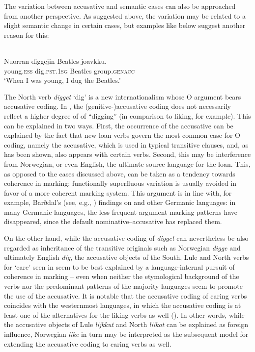 \documentclass[output=paper]{LSP/langsci}
\begin{document}
The variation between accusative and semantic cases can also be approached from another perspective. As suggested above, the variation may be related to a slight semantic change in certain cases, but examples like  below suggest another reason for this:

\begin{exe}
\ex%
\label{16-ki-ex:20}
\\
\gll Nuorran diggejin Beatles joavkku.\\
young.\textsc{ess} dig.\textsc{pst}.\textsc{1sg} Beatles group.\textsc{genacc}\\
\glt ‘When I was young, I dug the Beatles.’ 
\end{exe}


The North  verb \textit{digget} ‘dig’ is a new internationalism whose O argument bears accusative coding. In , the (genitive-)accusative coding does not necessarily reflect a higher degree of  of “digging” (in comparison to liking, for example). This can be explained in two ways. First, the occurrence of the accusative can be explained by the fact that new loan verbs govern the most common case for O coding, namely the accusative, which is used in typical transitive clauses, and, as has been shown, also appears with certain  verbs. Second, this may be interference from Norwegian, or even English, the ultimate source language for the loan. This, as opposed to the cases discussed above, can be taken as a tendency towards coherence in marking; functionally superfluous variation is usually avoided in favor of a more coherent marking system. This argument is in line with, for example, Barðdal’s (see, e.g., \citealt{Barddal2008Productivity,Barddal2009Germanic}) findings on  and other Germanic languages: in many Germanic languages, the less frequent argument marking patterns have disappeared, since the default nominative–accusative has replaced them.

 On the other hand, while the accusative coding of \textit{digget}  can nevertheless be also regarded as inheritance of the transitive originals such as Norwegian \textit{digge} and ultimately English \textit{dig}, the accusative objects of the South, Lule and North  verbs for ‘care’ seen in  seem to be best explained by a language-internal pursuit of coherence in marking – even when neither the etymological background of the verbs nor the predominant patterns of the majority languages seem to promote the use of the accusative. It is notable that the accusative coding of caring verbs coincides with the westernmost  languages, in which the accusative coding is at least one of the alternatives for the liking verbs as well (). In other words, while the accusative objects of Lule  \textit{lijkkut}  and North  \textit{liikot}  can be explained as foreign influence, Norwegian \textit{like} in turn may be interpreted as the subsequent model for extending the accusative coding to caring verbs as well.
\end{document}
